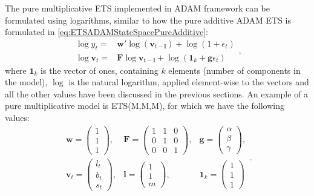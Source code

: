 \documentclass[
]{book}
\theoremstyle{definition}
\theoremstyle{definition}
\theoremstyle{definition}
\theoremstyle{definition}
\theoremstyle{remark}
\begin{document}
The pure multiplicative ETS implemented in ADAM framework can be formulated using logarithms, similar to how the pure additive ADAM ETS is formulated in \eqref{eq:ETSADAMStateSpacePureAdditive}:
\begin{equation}
  \begin{aligned}
        \log y_t = & \mathbf{w}' \log(\mathbf{v}_{t-\boldsymbol{l}}) + \log(1 + \epsilon_{t}) \\
        \log \mathbf{v}_{t} = & \mathbf{F} \log \mathbf{v}_{t-\boldsymbol{l}} + \log(\mathbf{1}_k + \mathbf{g} \epsilon_t)
  \end{aligned},
  \label{eq:ETSADAMStateSpacePureMultiplicative}
\end{equation}
where \(\mathbf{1}_k\) is the vector of ones, containing \(k\) elements (number of components in the model), \(\log\) is the natural logarithm, applied element-wise to the vectors and all the other values have been discussed in the previous sections. An example of a pure multiplicative model is ETS(M,M,M), for which we have the following values:
\begin{equation}
  \begin{aligned}
    \mathbf{w} = \begin{pmatrix} 1 \\ 1 \\ 1 \end{pmatrix}, & \mathbf{F} = \begin{pmatrix} 1 & 1 & 0 \\ 0 & 1 & 0 \\ 0 & 0 & 1 \end{pmatrix}, & \mathbf{g} = \begin{pmatrix} \alpha \\ \beta \\ \gamma \end{pmatrix}, \\
    \mathbf{v}_{t} = \begin{pmatrix} l_t \\ b_t \\ s_t \end{pmatrix}, & \boldsymbol{l} = \begin{pmatrix} 1 \\ 1 \\ m \end{pmatrix}, & \mathbf{1}_k = \begin{pmatrix} 1 \\ 1 \\ 1 \end{pmatrix}
  \end{aligned}.
  \label{eq:ETSADAMMMMMatrices}
\end{equation}
\end{document}
